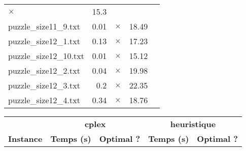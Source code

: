 \documentclass{article}
\begin{document}
\begin{center}
\begin{tabular}{lrrrr}
$\times$
 & 15.3 & 
\\
puzzle\_size11\_9.txt & 0.01 & 
$\times$
 & 18.49 & 
\\
puzzle\_size12\_1.txt & 0.13 & 
$\times$
 & 17.23 & 
\\
puzzle\_size12\_10.txt & 0.01 & 
$\times$
 & 15.12 & 
\\
puzzle\_size12\_2.txt & 0.04 & 
$\times$
 & 19.98 & 
\\
puzzle\_size12\_3.txt & 0.2 & 
$\times$
 & 22.35 & 
\\
puzzle\_size12\_4.txt & 0.34 & 
$\times$
 & 18.76 & 
\\
\hline\end{tabular}
\end{center}

\newpage
\begin{center}
\renewcommand{\arraystretch}{1.4} 
\begin{tabular}{lrrrr}
	\hline
 & \multicolumn{2}{c}{\textbf{cplex}} & \multicolumn{2}{c}{\textbf{heuristique}}\\
\textbf{Instance}  & \textbf{Temps (s)} & \textbf{Optimal ?}  & \textbf{Temps (s)} & \textbf{Optimal ?} \\\hline


\end{tabular}
\end{center}
\end{document}
